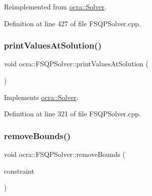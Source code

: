 Reimplemented from \hyperlink{classocra_1_1Solver_a7d45f67599edfa5ba8373b115378de5c}{ocra\+::\+Solver}.



Definition at line 427 of file F\+S\+Q\+P\+Solver.\+cpp.

\hypertarget{classocra_1_1FSQPSolver_ad41514dc166b19fca4812b5521777f0a}{}\label{classocra_1_1FSQPSolver_ad41514dc166b19fca4812b5521777f0a} 
\subsubsection{\texorpdfstring{print\+Values\+At\+Solution()}{printValuesAtSolution()}}
{\footnotesize\ttfamily void ocra\+::\+F\+S\+Q\+P\+Solver\+::print\+Values\+At\+Solution (\begin{DoxyParamCaption}\item[{void}]{ }\end{DoxyParamCaption})\hspace{0.3cm}{\ttfamily [virtual]}}



Implements \hyperlink{classocra_1_1Solver_ab1903098e25c16a9f92c36d37967e8fa}{ocra\+::\+Solver}.



Definition at line 321 of file F\+S\+Q\+P\+Solver.\+cpp.

\hypertarget{classocra_1_1FSQPSolver_a4dae031d10c7c4be13cd48de8588e69a}{}\label{classocra_1_1FSQPSolver_a4dae031d10c7c4be13cd48de8588e69a} 
\subsubsection{\texorpdfstring{remove\+Bounds()}{removeBounds()}\hspace{0.1cm}{\footnotesize\ttfamily [1/2]}}
{\footnotesize\ttfamily void ocra\+::\+F\+S\+Q\+P\+Solver\+::remove\+Bounds (\begin{DoxyParamCaption}\item[{\hyperlink{namespaceocra_a6e55fff77635080219964abc301abf18}{Bound\+Constraint} \&}]{constraint }\end{DoxyParamCaption})}



